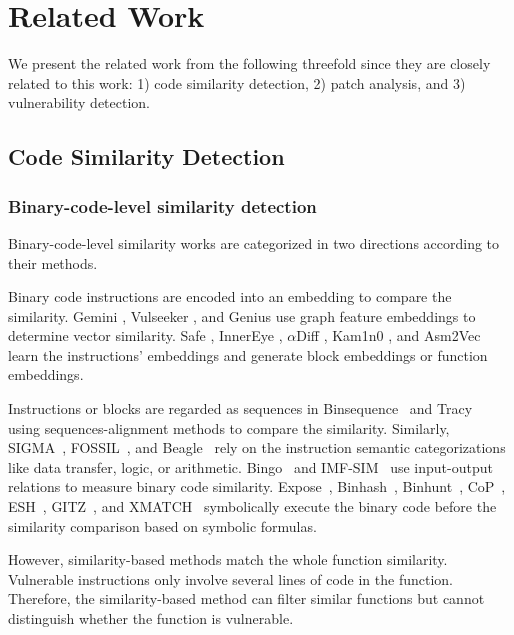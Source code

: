 \section{Related Work}
\label{sec:related}
We present the related work from the following threefold since they are closely related to this work: 1) code similarity detection, 2) patch analysis, and 3) vulnerability detection. 


\subsection{Code Similarity Detection}

\subsubsection{Binary-code-level similarity detection} 

Binary-code-level similarity works are categorized in two directions according to their methods.


 Binary code instructions are encoded into an embedding to compare the similarity. 
Gemini \cite{gemini}, Vulseeker \cite{VULSEEKER}, and Genius \cite{genius} use graph feature embeddings to determine vector similarity. 
Safe \cite{safe}, InnerEye \cite{innereye}, $\alpha$Diff \cite{aDiff}, Kam1n0 \cite{Kam1n0}, and Asm2Vec \cite{asm2vec} learn the instructions' embeddings and generate block embeddings or function embeddings. 


Instructions or blocks are regarded as sequences in Binsequence~\cite{binsequence} and Tracy~\cite{tracy} using sequences-alignment methods to compare the similarity.
Similarly, SIGMA~\cite{SIGMA}, FOSSIL~\cite{fossil}, and Beagle~\cite{BEAGLE} rely on the instruction semantic categorizations like data transfer, logic, or arithmetic. 
Bingo~\cite{bingo} and IMF-SIM~\cite{IMF-SIM} use input-output relations to measure binary code similarity. 
Expose~\cite{Expose}, Binhash~\cite{binhash}, Binhunt~\cite{binhunt}, CoP~\cite{COP}, ESH~\cite{esh}, GITZ~\cite{GITZ}, and XMATCH~\cite{xmatch} symbolically execute the binary code before the similarity comparison based on symbolic formulas. 


However, similarity-based methods match the whole function similarity. 
Vulnerable instructions only involve several lines of code in the function. 
Therefore, the similarity-based method can filter similar functions but cannot distinguish whether the function is vulnerable.

